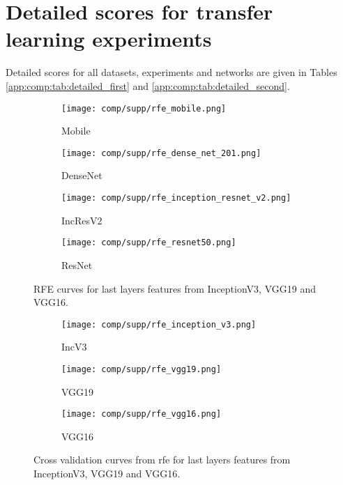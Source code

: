  \section{Detailed scores for transfer learning experiments}
\label{app:comp:sec:detailed_scores}

Detailed scores for all datasets, experiments and networks are given in Tables \ref{app:comp:tab:detailed_first} and \ref{app:comp:tab:detailed_second}.

\begin{figure}
	\centering
  \begin{subfigure}[t]{0.95\textwidth}
    \centering
    \texttt{[image: comp/supp/rfe\_mobile.png]} \\
    \caption{Mobile}
  \end{subfigure}
  \begin{subfigure}[t]{0.95\textwidth}
    \centering
    \texttt{[image: comp/supp/rfe\_dense\_net\_201.png]} \\
    \caption{DenseNet}
  \end{subfigure}
  \begin{subfigure}[t]{0.95\textwidth}
    \centering
    \texttt{[image: comp/supp/rfe\_inception\_resnet\_v2.png]} \\
    \caption{IncResV2}
  \end{subfigure}
    \begin{subfigure}[t]{0.95\textwidth}
    \centering
    \texttt{[image: comp/supp/rfe\_resnet50.png]}
    \caption{ResNet}
  \end{subfigure}
  \caption{RFE curves for last layers features from InceptionV3, VGG19 and VGG16.}
  \label{app:comp:fig:rfe_1}
\end{figure}

\begin{figure}
	\centering
  \begin{subfigure}[t]{0.99\textwidth}
    \centering
    \texttt{[image: comp/supp/rfe\_inception\_v3.png]} \\
    \caption{IncV3}
  \end{subfigure}
  \begin{subfigure}[t]{0.99\textwidth}
    \centering
    \texttt{[image: comp/supp/rfe\_vgg19.png]} \\
    \caption{VGG19}
  \end{subfigure}
  \begin{subfigure}[t]{0.99\textwidth}
    \centering
    \texttt{[image: comp/supp/rfe\_vgg16.png]} \\
    \caption{VGG16}
  \end{subfigure}
  \caption{Cross validation curves from \acrlong{rfe} for last layers features from InceptionV3, VGG19 and VGG16.}
  \label{app:comp:fig:rfe_2}
\end{figure}

